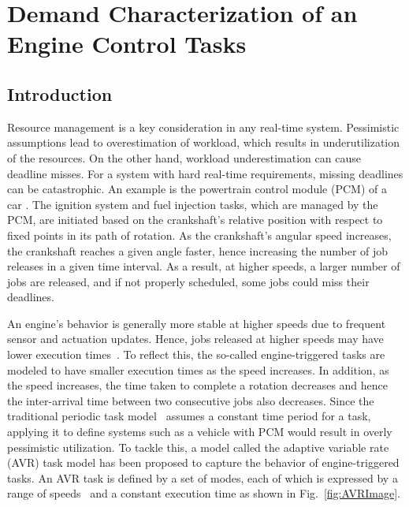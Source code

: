 \section{Demand Characterization of an Engine Control Tasks}   \label{chap:codesign}

\subsection{Introduction}

Resource management is a key consideration in any real-time system.
Pessimistic assumptions lead to overestimation of workload, which results in underutilization of the resources. On the other hand, workload underestimation can cause deadline misses.
For a system with hard real-time requirements, missing deadlines can be catastrophic.
An example is the powertrain control module (PCM) of a car \cite{noauthor_electricalelectronic_2008}. 
The ignition system and fuel injection tasks, which are managed by the PCM, are initiated based on the crankshaft's relative position with respect to fixed points in its path of rotation. 
As the crankshaft's angular speed increases, the crankshaft reaches a given angle faster, hence increasing the number of job releases in a given time interval.
As a result, at higher speeds, a larger number of jobs are released, and if not properly scheduled, some jobs could miss their deadlines.

An engine's behavior is generally more stable at higher speeds due to frequent sensor and actuation updates. Hence, jobs released at higher speeds may have lower execution times~\cite{dbuttle_real-time_nodate}.
To reflect this, the so-called engine-triggered tasks are modeled to have smaller execution times as the speed increases.
In addition, as the speed increases, the time taken to complete a rotation decreases and hence the inter-arrival time between two consecutive jobs also decreases.
Since the traditional periodic task model~\cite{liu_scheduling_1973} assumes a constant time period for a task, applying it to define systems such as a vehicle with PCM would result in overly pessimistic utilization.
To tackle this, a model called the adaptive variable rate (AVR) task model has been proposed to capture the behavior of engine-triggered tasks.
An AVR task is defined by a set of modes, each of which is expressed by a range of speeds~\cite{dbuttle_real-time_nodate} and a constant execution time as shown in Fig.~\ref{fig:AVRImage}.

